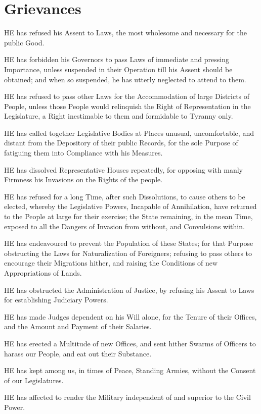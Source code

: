 \section{Grievances}

HE has refused his Assent to Laws, the most wholesome and necessary for the public Good.

HE has forbidden his Governors to pass Laws of immediate and pressing Importance, unless suspended in their Operation till his Assent should be obtained; and when so suspended, he has utterly neglected to attend to them.

HE has refused to pass other Laws for the Accommodation of large Districts of People, unless those People would relinquish the Right of Representation in the Legislature, a Right inestimable to them and formidable to Tyranny only.

HE has called together Legislative Bodies at Places unusual, uncomfortable, and distant from the Depository of their public Records, for the sole Purpose of fatiguing them into Compliance with his Measures.

HE has dissolved Representative Houses repeatedly, for opposing with manly Firmness his Invasions on the Rights of the people.

HE has refused for a long Time, after such Dissolutions, to cause others to be elected, whereby the Legislative Powers, Incapable of Annihilation, have returned to the People at large for their exercise; the State remaining, in the mean Time, exposed to all the Dangers of Invasion from without, and Convulsions within.

HE has endeavoured to prevent the Population of these States; for that Purpose obstructing the Laws for Naturalization of Foreigners; refusing to pass others to encourage their Migrations hither, and raising the Conditions of new Appropriations of Lands.

HE has obstructed the Administration of Justice, by refusing his Assent to Laws for establishing Judiciary Powers.

HE has made Judges dependent on his Will alone, for the Tenure of their Offices, and the Amount and Payment of their Salaries.

HE has erected a Multitude of new Offices, and sent hither Swarms of Officers to harass our People, and eat out their Substance.

HE has kept among us, in times of Peace, Standing Armies, without the Consent of our Legislatures.

HE has affected to render the Military independent of and superior to the Civil Power.

